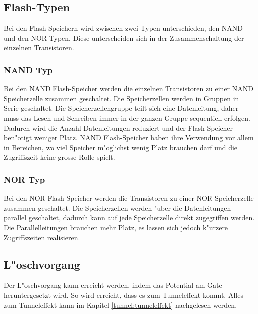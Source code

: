 \begin{refsection}
\subsection{Flash-Typen}
Bei den Flash-Speichern wird zwischen zwei Typen unterschieden, den NAND
und den NOR Typen.
Diese unterscheiden sich in der Zusammenschaltung der einzelnen Transistoren.

\subsubsection{NAND Typ}
Bei den NAND Flash-Speicher werden die einzelnen Transistoren zu einer
NAND Speicherzelle zusammen geschaltet.
Die Speicherzellen werden in Gruppen in Serie geschaltet.
Die Speicherzellengruppe teilt sich eine Datenleitung, daher muss das
Lesen und Schreiben immer in der ganzen Gruppe sequentiell erfolgen.
Dadurch wird die Anzahl Datenleitungen reduziert und der Flash-Speicher
ben"otigt weniger Platz.
NAND Flash-Speicher haben ihre Verwendung vor allem in Bereichen, wo viel
Speicher m"oglichst wenig Platz brauchen darf und die Zugriffszeit keine
grosse Rolle spielt.

\subsubsection{NOR Typ}
Bei den NOR Flash-Speicher werden die Transistoren zu einer NOR
Speicherzelle zusammen geschaltet.
Die Speicherzellen werden "uber die Datenleitungen parallel geschaltet,
dadurch kann auf jede Speicherzelle direkt zugegriffen werden.
Die Parallelleitungen brauchen mehr Platz, es lassen sich jedoch k"urzere
Zugriffszeiten realisieren.

\subsection{L"oschvorgang}
Der L"oschvorgang kann erreicht werden, indem das Potential am Gate
heruntergesetzt wird.
So wird erreicht, dass es zum Tunneleffekt kommt.
Alles zum Tunneleffekt kann im Kapitel \ref{tunnel:tunneleffekt} nachgelesen werden.


\end{refsection}
